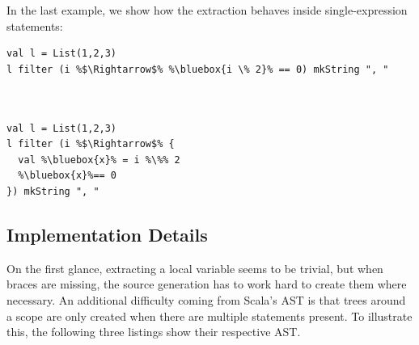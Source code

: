 \documentclass[10pt,a4paper,oneside]{scrreprt}
\begin{document}
In the last example, we show how the extraction behaves inside single-expression statements:

\begin{multicols}{2}
\begin{lstlisting}
val l = List(1,2,3)
l filter (i %$\Rightarrow$% %\bluebox{i \% 2}% == 0) mkString ", "



\end{lstlisting}
\begin{lstlisting}
val l = List(1,2,3) 
l filter (i %$\Rightarrow$% {
  val %\bluebox{x}% = i %\%% 2 
  %\bluebox{x}%== 0
}) mkString ", "
\end{lstlisting}
\end{multicols}

\subsection{Implementation Details}

On the first glance, extracting a local variable seems to be trivial, but when braces are missing, the source generation has to work hard to create them where necessary. An additional difficulty coming from Scala's AST is that  trees around a scope are only created when there are multiple statements present. To illustrate this, the following three listings show their respective AST.
\end{document}
